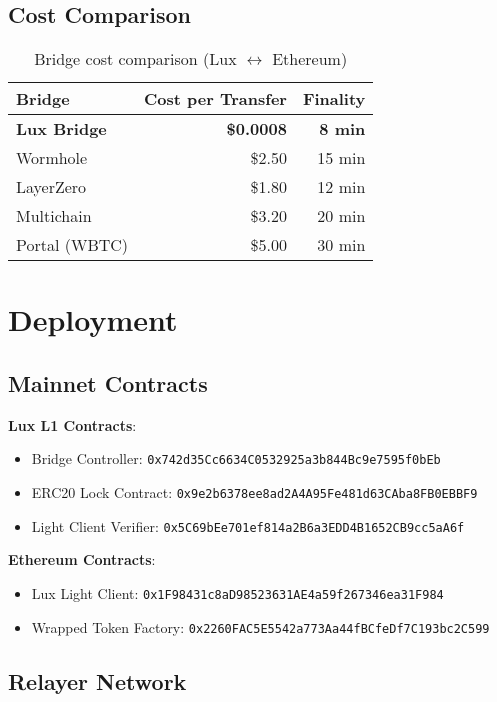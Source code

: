 \documentclass[11pt]{article}
\begin{document}
\subsection{Cost Comparison}

\begin{table}[h]
\centering
\begin{tabular}{lrr}
\toprule
Bridge & Cost per Transfer & Finality \\
\midrule
\textbf{Lux Bridge} & \textbf{\$0.0008} & \textbf{8 min} \\
Wormhole & \$2.50 & 15 min \\
LayerZero & \$1.80 & 12 min \\
Multichain & \$3.20 & 20 min \\
Portal (WBTC) & \$5.00 & 30 min \\
\bottomrule
\end{tabular}
\caption{Bridge cost comparison (Lux $\leftrightarrow$ Ethereum)}
\end{table}

\section{Deployment}

\subsection{Mainnet Contracts}

\textbf{Lux L1 Contracts}:
\begin{itemize}[leftmargin=1.1em]
  \item Bridge Controller: \texttt{0x742d35Cc6634C0532925a3b844Bc9e7595f0bEb}
  \item ERC20 Lock Contract: \texttt{0x9e2b6378ee8ad2A4A95Fe481d63CAba8FB0EBBF9}
  \item Light Client Verifier: \texttt{0x5C69bEe701ef814a2B6a3EDD4B1652CB9cc5aA6f}
\end{itemize}

\textbf{Ethereum Contracts}:
\begin{itemize}[leftmargin=1.1em]
  \item Lux Light Client: \texttt{0x1F98431c8aD98523631AE4a59f267346ea31F984}
  \item Wrapped Token Factory: \texttt{0x2260FAC5E5542a773Aa44fBCfeDf7C193bc2C599}
\end{itemize}

\subsection{Relayer Network}
\end{document}
